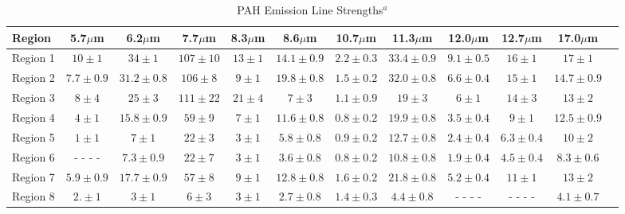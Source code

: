 \begin{table}
 \centering
 \begin{minipage}{200mm}
\caption{PAH Emission Line Strengths$^a$}
  \begin{tabular}{l c c  c  c  c  c  c  c  c  c c }
  \hline {Region  }&{5.7$\mu$m  }&{6.2$\mu$m  }&{7.7$\mu$m  }&{8.3$\mu$m  }&{8.6$\mu$m  }&{10.7$\mu$m  }&{11.3$\mu$m  }&{12.0$\mu$m  }&{12.7$\mu$m  }&{17.0$\mu$m  } 
   \\
 \hline
 
 
 Region 1 &$10\pm1$            & $34\pm1$        & $107\pm10$        & $13\pm1$       & $14.1\pm0.9$        & $2.2\pm0.3$        & $33.4\pm0.9$        & $9.1\pm0.5$        & $16\pm1$        & $17\pm1$        \\
Region 2 &$7.7\pm0.9$        & $31.2\pm0.8$        & $106\pm8$        & $9\pm1$           & $19.8\pm0.8$        & $1.5\pm0.2$        & $32.0\pm0.8$        & $6.6\pm0.4$        & $15\pm1$        & $14.7\pm0.9$        \\
Region 3 &$8\pm4$              & $25\pm3$                & $111\pm22$       &$21\pm4$       & $7\pm3$                 & $1.1\pm0.9$        & $19\pm3$             & $6\pm1$             & $14\pm3$           & $13\pm2$        \\
Region 4 &$4\pm1$              & $15.8\pm0.9$        & $59\pm9$        & $7\pm1$           & $11.6\pm0.8$          & $0.8\pm0.2$        & $19.9\pm0.8$        & $3.5\pm0.4$        & $9\pm1$             & $12.5\pm0.9$        \\
Region 5 &$1\pm1$              & $7\pm1$                 & $22\pm3$        & $3\pm1$           & $5.8\pm0.8$            & $0.9\pm0.2$        & $12.7\pm0.8$        & $2.4\pm0.4$        & $6.3\pm0.4$        & $10\pm2$        \\
Region 6 & - - - -                      &$ 7.3\pm0.9$         & $22\pm7$        & $3\pm1$            & $3.6\pm0.8$       & $0.8\pm0.2$        & $10.8\pm0.8$        & $1.9\pm0.4$        & $4.5\pm0.4$        & $8.3\pm0.6$        \\
Region 7 &$5.9\pm0.9$        & $17.7\pm0.9$       & $57\pm8$        & $9\pm1$            & $12.8\pm0.8$        & $1.6\pm0.2$        & $21.8\pm0.8$        & $5.2\pm0.4$        & $11\pm1$             & $13\pm2$        \\
Region 8 &$2.\pm1$              & $3\pm1$              & $6\pm3$            & $3\pm1$            & $2.7\pm0.8$        & $1.4\pm0.3$        & $4.4\pm0.8$            & - - - -                      &  - - - -               & $4.1\pm0.7$        \\

\end{tabular}
\end{minipage}
\end{table}
